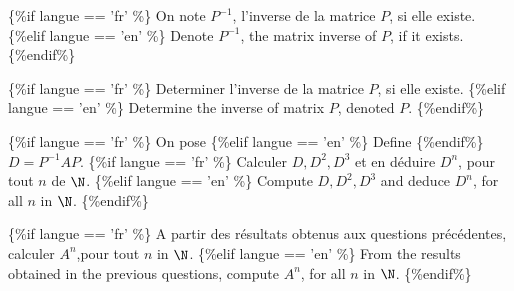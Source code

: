 






\{\%if langue == 'fr' \%\}
On note $P^{-1}$, l'inverse de la matrice $P$, si elle existe.
\{\%elif langue == 'en' \%\}
Denote  $P^{-1}$, the matrix inverse of $P$, if it exists.
\{\%endif\%\}

\ben

\item 
\{\%if langue == 'fr' \%\}
Determiner l'inverse de la matrice $P$, si elle existe.
\{\%elif langue == 'en' \%\}
Determine the inverse of matrix $P$, denoted $P$.
\{\%endif\%\}



\item
\{\%if langue == 'fr' \%\}
On pose 
\{\%elif langue == 'en' \%\}
Define
\{\%endif\%\}
$D=P^{-1}AP$. 
%
%
\{\%if langue == 'fr' \%\}
Calculer $D, D^{2}, D^{3}$ et en déduire $D^{n}$, pour tout $n$ de $\N$.
\{\%elif langue == 'en' \%\}
Compute $D, D^{2}, D^{3}$ and deduce $D^{n}$, for all $n$ in $\N$.
\{\%endif\%\}


\item
\{\%if langue == 'fr' \%\}
A partir des résultats obtenus aux questions précédentes, calculer $A^{n}$,pour tout  $n$ in $\N$.
\{\%elif langue == 'en' \%\}
From the results obtained in the previous questions, compute  $A^{n}$, for all $n$ in $\N$.
\{\%endif\%\}





\een








